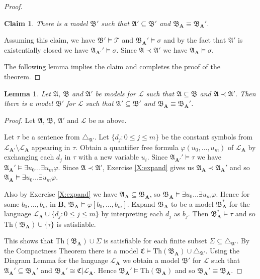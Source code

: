 \documentclass[titlepage, oneside]{amsbook}
\theoremstyle{plain}
\newtheorem{lemma}{Lemma}
\newtheorem*{claim}{Claim}
\theoremstyle{definition}
\theoremstyle{remark}
\newcommand{\Th}{\ensuremath{\mbox{Th}}}
\newcommand{\theory}{\ensuremath{\mathcal{T}}}
\newcommand{\lan}{\ensuremath{\mathcal{L}}}
\newcommand{\seq}{\ensuremath{\subseteq}}
\newcommand{\ma}{\ensuremath{\mathfrak{A}}}
\newcommand{\mb}{\ensuremath{\mathfrak{B}}}
\newcommand{\mc}{\ensuremath{\mathfrak{C}}}
\newcommand{\ba}{\ensuremath{\mathbf{A}}}
\newcommand{\existsu}[2]{\ensuremath{\exists #1_{0}  \dots  \exists 
#1_{#2}}}
\newcommand{\bnot}[2][0]{\ensuremath{ b_{#1} , \dots , b_{#2}}}
\newcommand{\unot}[2][0]{\ensuremath{ u_{#1} , \dots , u_{#2}}}
\begin{document}
\begin{proof}
\begin{claim} There is a model $\mb'$ such that $\ma' \subseteq \mb' $ and
$\mb_\ba \equiv \mb_\ba' $.
\end{claim}

Assuming this claim, we have 
$\mb' \models \theory$ and 
$\mb_{\ba}' \models \sigma$ and by the fact that $\ma'$ is
existentially 
closed we have $\ma_{\ba'}' \models \sigma$. Since $\ma 
\prec \ma'$ we have $\ma_\ba  \models \sigma$.

The following lemma implies the claim and completes the proof of the 
theorem.

\end{proof}


\begin{lemma} Let $\ma$, $\mb$ and $\ma'$ be models for $\lan$ such that
$\ma \seq \mb$ and $\ma \prec \ma'$. Then there is a model $\mb'$ for
$\lan$ such that $\ma' \seq \mb'$ and $\mb_\ba \equiv
\mb_\ba'$.
\end{lemma}


\begin{proof} Let \ma, \mb, $\ma'$ and $\lan$ be as above.

Let $\tau$ be a  sentence from $\triangle_{\ma'}$.
%
Let $\{ d_j : 0 \leq j \leq m \}$ be the constant symbols from
$\lan_{\ba'} \setminus \lan_\ba $ appearing in $\tau$. Obtain a quantifier
free formula $\varphi ( \unot{m} ) $
of $\lan_\ba$ by exchanging each $d_j$ in $\tau$ with a new variable
$u_i$.
Since $\ma_{\ba'}' \models \tau$ we have $\ma_\ba' \models \existsu{u}{m}
\varphi $.
%
Since $\ma \prec \ma'$, Exercise \ref{X:expand} gives us $\ma_\ba \prec \ma_\ba'$ and so $\ma_\ba \models \existsu{u}{m} \varphi $.
%

Also by Exercise \ref{X:expand} we have $\ma_\ba \seq \mb_\ba$, so  $ \mb_\ba \models \existsu{u}{m} \varphi $.
%
Hence for some $\bnot{m}$ in $\mathbf{B}$, $\mb_\ba \models \varphi [ 
\bnot{m} ]$.
%
Expand $\mb_\ba$ to be a model $\mb_{\ba}^{\ast}$ for the language 
$\lan_\ba \cup \{d_j : 0 \leq j \leq m \}$ by interpreting each $d_j$ as $b_j$.
%
Then $\mb_{\ba}^{\ast} \models \tau$ and so $\mbox{Th}(\mb_\ba) \cup \{
\tau \} $ is satisfiable.
%

This shows that $\Th (\mb_\ba) \cup \Sigma$ is satisfiable for each
finite subset $\Sigma \seq \triangle_{\ma'}$.  
By the Compactness Theorem there is a model 
$\mc \models \Th (\mb_\ba)  \cup \triangle_{\ma'}$.  
Using the Diagram Lemma for the language $\lan_\ba$ we
obtain a model $\mb'$ for $\lan$ such that $\ma_{\ba}' \seq \mb_{\ba}'$
and $\mb_{\ba}' \cong \mc | \lan_\ba$.  
Hence $\mb_{\ba}' \models \Th(\mb_\ba)$ and so $\mb_{\ba}' \equiv \mb_\ba$.



\end{proof}
\end{document}

